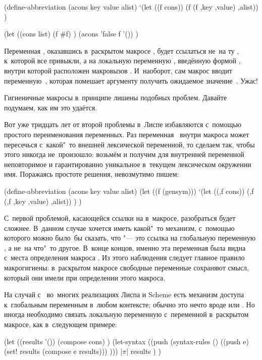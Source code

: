 \begin{code:lisp}
(define-abbreviation (acons key value alist)
  `(let ((f cons)) (f (f ,key ,value) ,alist)) )

(let ((cons list)
      (f #f) )
  (acons 'false f '()) )
\end{code:lisp}

Переменная , оказавшись в~раскрытом макросе , будет
ссылаться не~на ту , к~которой все привыкли, а на локальную переменную
, введённую формой , внутри которой расположен макровызов
. И~наоборот, сам макрос  вводит переменную~, которая
помешает аргументу  получить ожидаемое значение~. Ужас!

Гигиеничные макросы в~принципе лишены подобных проблем. Давайте подумаем, как им
это удаётся.

Вот уже тридцать лет от второй проблемы в~Лиспе избавляются с~помощью простого
переименования переменных. Раз переменная~ внутри макроса может пересечься
с~какой"~то внешней лексической переменной, то сделаем так, чтобы этого никогда
не~произошло: возьмём  и получим для внутренней переменной
неповторимое и гарантированно уникальное в~текущем лексическом окружении имя.
Поражаясь простоте решения, невозмутимо пишем:

\begin{code:lisp}
(define-abbreviation (acons key value alist)
  (let ((f (gensym)))
    `(let ((,f cons)) (,f (,f ,key ,value) ,alist)) ) )
\end{code:lisp}

С~первой проблемой, касающейся ссылки на  в~макросе, разобраться будет
сложнее. В~данном случае хочется иметь какой"~то механизм, с~помощью которого
можно было~бы сказать, что  "--- это ссылка на глобальную переменную
, а не~на что"~то другое. В~конце концов, именно эта переменная
 была видна с~места определения макроса . Из этого наблюдения
следует главное правило макрогигиены: в~раскрытом макросе свободные переменные
сохраняют смысл, который они имели при определении этого макроса.

На случай с~ во~многих реализациях Лиспа и Scheme есть механизм доступа
к~глобальным переменным в~любом контексте; обычно это нечто вроде  или . Но иногда необходимо связать локальную переменную
с~переменной в~раскрытом макросе, как в~следующем примере:

\begin{code:lisp}
(let ((results '())
      (compose cons) )
  (let-syntax ((push (syntax-rules ()
                      ((push e) (set! results (compose e results))) )))
    |$\pi$|
    results ) )
\end{code:lisp}

